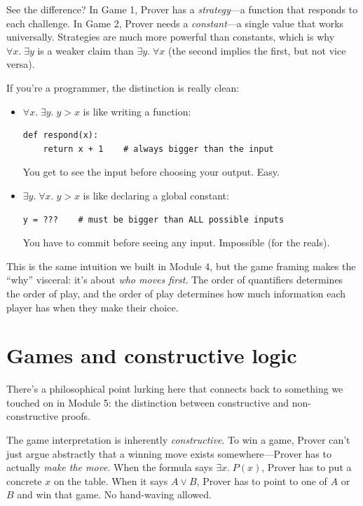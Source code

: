 \documentclass[11pt]{article}
\begin{document}
\medskip

See the difference? In Game 1, Prover has a \emph{strategy}---a function that responds to each challenge. In Game 2, Prover needs a \emph{constant}---a single value that works universally. Strategies are much more powerful than constants, which is why $\forall x.\;\exists y$ is a weaker claim than $\exists y.\;\forall x$ (the second implies the first, but not vice versa).

If you're a programmer, the distinction is really clean:
\begin{itemize}
  \item $\forall x.\;\exists y.\; y > x$ is like writing a function:
\begin{lstlisting}
def respond(x):
    return x + 1    # always bigger than the input
\end{lstlisting}
  You get to see the input before choosing your output. Easy.

  \item $\exists y.\;\forall x.\; y > x$ is like declaring a global constant:
\begin{lstlisting}
y = ???    # must be bigger than ALL possible inputs
\end{lstlisting}
  You have to commit before seeing any input. Impossible (for the reals).
\end{itemize}

This is the same intuition we built in Module 4, but the game framing makes the ``why'' visceral: it's about \emph{who moves first}. The order of quantifiers determines the order of play, and the order of play determines how much information each player has when they make their choice.

\section{Games and constructive logic}

There's a philosophical point lurking here that connects back to something we touched on in Module 5: the distinction between constructive and non-constructive proofs.

The game interpretation is inherently \emph{constructive}. To win a game, Prover can't just argue abstractly that a winning move exists somewhere---Prover has to actually \emph{make the move}. When the formula says $\exists x.\; P(x)$, Prover has to put a concrete $x$ on the table. When it says $A \vee B$, Prover has to point to one of $A$ or $B$ and win that game. No hand-waving allowed.
\end{document}
